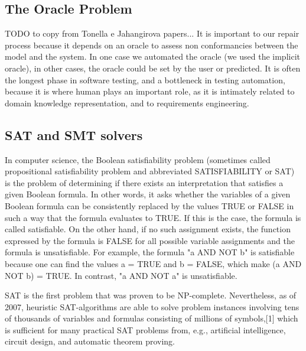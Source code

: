 \documentclass [a4paper, 12pt, twoside]{report}
\theoremstyle{plain}
\theoremstyle{definition}
\theoremstyle{remark}
\theoremstyle{plain}
\theoremstyle{plain}
\theoremstyle{remark}
\begin{document}
\subsection{The Oracle Problem}
TODO to copy from Tonella e Jahangirova papers...
It is important to our repair process because it depends on an oracle to assess non conformancies between the model and the system.
In one case we automated the oracle (we used the implicit oracle), in other cases, the oracle could be set by the user or predicted.
It is often the longest phase in software testing, and a bottleneck in testing automation, because it is where human plays an important role, as it is intimately related to domain knowledge representation, and to requirements engineering.

\subsection{SAT and SMT solvers}


In computer science, the Boolean satisfiability problem (sometimes called propositional satisfiability problem and abbreviated SATISFIABILITY or SAT) is the problem of determining if there exists an interpretation that satisfies a given Boolean formula. 
In other words, it asks whether the variables of a given Boolean formula can be consistently replaced by the values TRUE or FALSE in such a way that the formula evaluates to TRUE. If this is the case, the formula is called satisfiable. On the other hand, if no such assignment exists, the function expressed by the formula is FALSE for all possible variable assignments and the formula is unsatisfiable. For example, the formula "a AND NOT b" is satisfiable because one can find the values a = TRUE and b = FALSE, which make (a AND NOT b) = TRUE. In contrast, "a AND NOT a" is unsatisfiable.

SAT is the first problem that was proven to be NP-complete.
Nevertheless, as of 2007, heuristic SAT-algorithms are able to solve problem instances involving tens of thousands of variables and formulas consisting of millions of symbols,[1] which is sufficient for many practical SAT problems from, e.g., artificial intelligence, circuit design, and automatic theorem proving.
\end{document}
